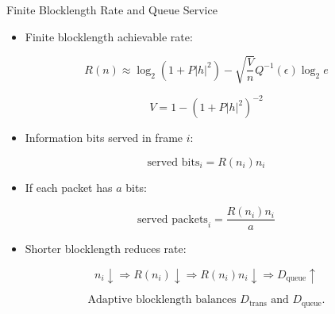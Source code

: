 \documentclass{beamer}
\begin{document}
\begin{frame}{Finite Blocklength Rate and Queue Service}
\small

\begin{itemize}
    \item Finite blocklength achievable rate:
\end{itemize}

\[
R(n)
\approx
\log_2(1+P|h|^2)
-
\sqrt{\frac{V}{n}}Q^{-1}(\epsilon)\log_2 e
\]

\[
V = 1-(1+P|h|^2)^{-2}
\]

\begin{itemize}
    \item Information bits served in frame $i$:
\end{itemize}

\[
\text{served bits}_i = R(n_i)n_i
\]

\begin{itemize}
    \item If each packet has $a$ bits:
\end{itemize}

\[
\text{served packets}_i
=
\frac{R(n_i)n_i}{a}
\]

\begin{itemize}
    \item Shorter blocklength reduces rate:
\end{itemize}

\[
n_i \downarrow
\Rightarrow
R(n_i) \downarrow
\Rightarrow
R(n_i)n_i \downarrow
\Rightarrow
D_{\text{queue}} \uparrow
\]

\[
\boxed{
\text{Adaptive blocklength balances } D_{\text{trans}} \text{ and } D_{\text{queue}}.
}
\]

\end{frame}
\end{document}
